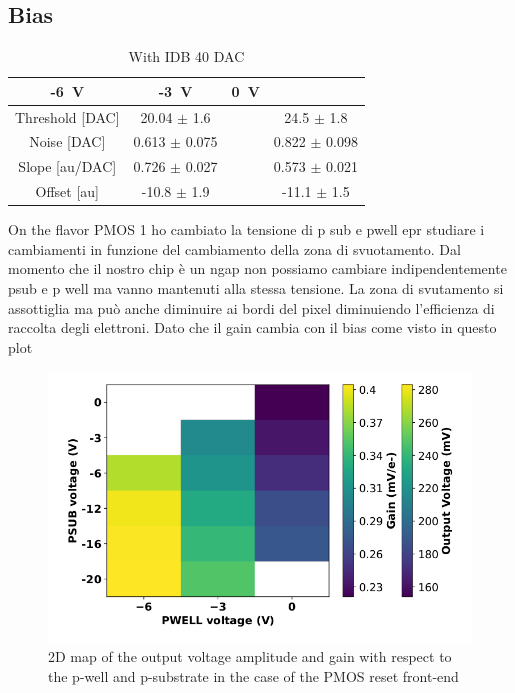     \subsection{Bias}
            \begin{table}
            \begin{center}
            \begin{tabular}{| c |  c | c | c |}
            \hline
            -\SI{6}{V} & -\SI{3}{V} & \SI{0}{V}\\
            \hline
            \hline
            Threshold [DAC] & 20.04 $\pm$ 1.6 & & 24.5 $\pm$ 1.8\\
            Noise [DAC] & 0.613 $\pm$ 0.075 & & 0.822 $\pm$ 0.098\\
            Slope [au/DAC] & 0.726 $\pm$ 0.027 & & 0.573 $\pm$ 0.021\\
            Offset [au] & -10.8 $\pm$ 1.9 & & -11.1 $\pm$ 1.5 \\
            \hline
            \end{tabular}
            \caption{With IDB 40 DAC }
            \label{tab:}
            \end{center}
        \end{table}  



        On the flavor PMOS 1 ho cambiato la tensione di p sub e pwell epr studiare i cambiamenti in funzione del cambiamento della zona di svuotamento. 
        Dal momento che il nostro chip è un ngap non possiamo cambiare indipendentemente psub e p well ma vanno mantenuti alla stessa tensione.
        La zona di svutamento si assottiglia ma può anche diminuire ai bordi del pixel diminuiendo l'efficienza di raccolta degli elettroni. 
        Dato che il gain cambia con il bias come visto in questo plot    
        
        \begin{figure}[h!]
            \centering
            \includegraphics[width=.90\linewidth]{figures/charaterization/gain_vs_bias.png}
            \caption{2D map of the output voltage amplitude and gain with respect to the p-well and p-substrate in the case of the PMOS reset front-end }
            \label{fig:gain_vs_bias}
        \end{figure}  
        
